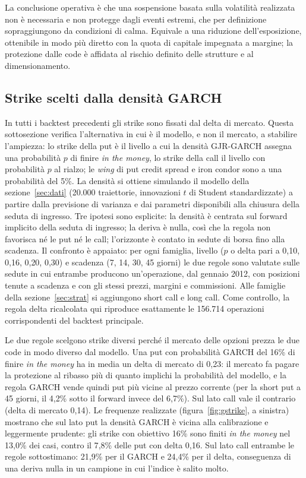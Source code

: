 \documentclass[11pt,a4paper]{article}
\begin{document}
La conclusione operativa è che una sospensione basata sulla volatilità realizzata non è necessaria e non protegge dagli eventi estremi, che per definizione sopraggiungono da condizioni di calma. Equivale a una riduzione dell'esposizione, ottenibile in modo più diretto con la quota di capitale impegnata a margine; la protezione dalle code è affidata al rischio definito delle strutture e al dimensionamento.

\subsection{Strike scelti dalla densità GARCH}\label{sec:gstrike}

In tutti i backtest precedenti gli strike sono fissati dal delta di mercato. Questa sottosezione verifica l'alternativa in cui è il modello, e non il mercato, a stabilire l'ampiezza: lo strike della put è il livello a cui la densità GJR-GARCH assegna una probabilità $p$ di finire \emph{in the money}, lo strike della call il livello con probabilità $p$ al rialzo; le \emph{wing} di put credit spread e iron condor sono a una probabilità del 5\%. La densità si ottiene simulando il modello della sezione~\ref{sec:dati} (20.000 traiettorie, innovazioni $t$ di Student standardizzate) a partire dalla previsione di varianza e dai parametri disponibili alla chiusura della seduta di ingresso. Tre ipotesi sono esplicite: la densità è centrata sul forward implicito della seduta di ingresso; la deriva è nulla, così che la regola non favorisca né le put né le call; l'orizzonte è contato in sedute di borsa fino alla scadenza. Il confronto è appaiato: per ogni famiglia, livello ($p$ o delta pari a 0{,}10, 0{,}16, 0{,}20, 0{,}30) e scadenza (7, 14, 30, 45 giorni) le due regole sono valutate sulle sedute in cui entrambe producono un'operazione, dal gennaio 2012, con posizioni tenute a scadenza e con gli stessi prezzi, margini e commissioni. Alle famiglie della sezione~\ref{sec:strat} si aggiungono short call e long call. Come controllo, la regola delta ricalcolata qui riproduce esattamente le 156.714 operazioni corrispondenti del backtest principale.

Le due regole scelgono strike diversi perché il mercato delle opzioni prezza le due code in modo diverso dal modello. Una put con probabilità GARCH del 16\% di finire \emph{in the money} ha in media un delta di mercato di 0{,}23: il mercato fa pagare la protezione al ribasso più di quanto implichi la probabilità del modello, e la regola GARCH vende quindi put più vicine al prezzo corrente (per la short put a 45 giorni, il 4{,}2\% sotto il forward invece del 6{,}7\%). Sul lato call vale il contrario (delta di mercato 0{,}14). Le frequenze realizzate (figura~\ref{fig:gstrike}, a sinistra) mostrano che sul lato put la densità GARCH è vicina alla calibrazione e leggermente prudente: gli strike con obiettivo 16\% sono finiti \emph{in the money} nel 13{,}0\% dei casi, contro il 7{,}8\% delle put con delta 0{,}16. Sul lato call entrambe le regole sottostimano: 21{,}9\% per il GARCH e 24{,}4\% per il delta, conseguenza di una deriva nulla in un campione in cui l'indice è salito molto.
\end{document}

